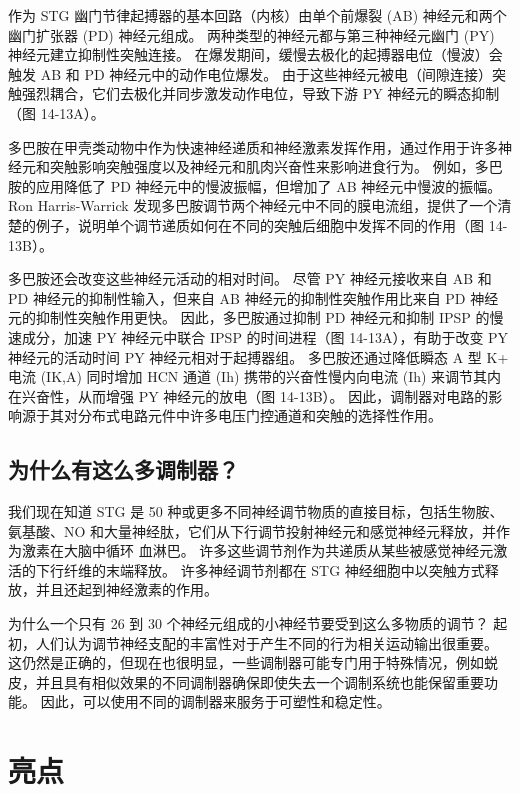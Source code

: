 作为 STG 幽门节律起搏器的基本回路（内核）由单个前爆裂 (AB) 神经元和两个幽门扩张器 (PD) 神经元组成。 两种类型的神经元都与第三种神经元幽门 (PY) 神经元建立抑制性突触连接。 在爆发期间，缓慢去极化的起搏器电位（慢波）会触发 AB 和 PD 神经元中的动作电位爆发。 由于这些神经元被电（间隙连接）突触强烈耦合，它们去极化并同步激发动作电位，导致下游 PY 神经元的瞬态抑制（图 14-13A）。

多巴胺在甲壳类动物中作为快速神经递质和神经激素发挥作用，通过作用于许多神经元和突触影响突触强度以及神经元和肌肉兴奋性来影响进食行为。 例如，多巴胺的应用降低了 PD 神经元中的慢波振幅，但增加了 AB 神经元中慢波的振幅。 Ron Harris-Warrick 发现多巴胺调节两个神经元中不同的膜电流组，提供了一个清楚的例子，说明单个调节递质如何在不同的突触后细胞中发挥不同的作用（图 14-13B）。

多巴胺还会改变这些神经元活动的相对时间。 尽管 PY 神经元接收来自 AB 和 PD 神经元的抑制性输入，但来自 AB 神经元的抑制性突触作用比来自 PD 神经元的抑制性突触作用更快。 因此，多巴胺通过抑制 PD 神经元和抑制 IPSP 的慢速成分，加速 PY 神经元中联合 IPSP 的时间进程（图 14-13A），有助于改变 PY 神经元的活动时间 PY 神经元相对于起搏器组。 多巴胺还通过降低瞬态 A 型 K+ 电流 (IK,A) 同时增加 HCN 通道 (Ih) 携带的兴奋性慢内向电流 (Ih) 来调节其内在兴奋性，从而增强 PY 神经元的放电（图 14-13B）。 因此，调制器对电路的影响源于其对分布式电路元件中许多电压门控通道和突触的选择性作用。



\subsection{为什么有这么多调制器？}

我们现在知道 STG 是 50 种或更多不同神经调节物质的直接目标，包括生物胺、氨基酸、NO 和大量神经肽，它们从下行调节投射神经元和感觉神经元释放，并作为激素在大脑中循环 血淋巴。 许多这些调节剂作为共递质从某些被感觉神经元激活的下行纤维的末端释放。 许多神经调节剂都在 STG 神经细胞中以突触方式释放，并且还起到神经激素的作用。

为什么一个只有 26 到 30 个神经元组成的小神经节要受到这么多物质的调节？ 起初，人们认为调节神经支配的丰富性对于产生不同的行为相关运动输出很重要。 这仍然是正确的，但现在也很明显，一些调制器可能专门用于特殊情况，例如蜕皮，并且具有相似效果的不同调制器确保即使失去一个调制系统也能保留重要功能。 因此，可以使用不同的调制器来服务于可塑性和稳定性。

\section{亮点}

